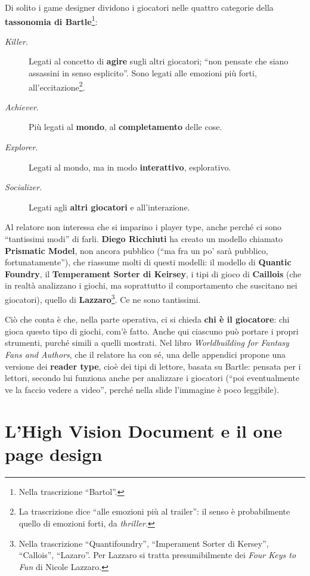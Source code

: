 Di solito i game designer dividono i giocatori nelle quattro categorie della
\textbf{tassonomia di Bartle}\footnote{Nella trascrizione ``Bartol''.}:
\begin{description}
  \item[\emph{Killer}.] Legati al concetto di \textbf{agire} sugli altri
        giocatori; ``non pensate che siano assassini in senso esplicito''. Sono
        legati alle emozioni più forti, all'eccitazione\footnote{La trascrizione
        dice ``alle emozioni più al trailer'': il senso è probabilmente quello di
        emozioni forti, da \emph{thriller}.}.
  \item[\emph{Achiever}.] Più legati al \textbf{mondo}, al \textbf{completamento}
        delle cose.
  \item[\emph{Explorer}.] Legati al mondo, ma in modo \textbf{interattivo},
        esplorativo.
  \item[\emph{Socializer}.] Legati agli \textbf{altri giocatori} e
        all'interazione.
\end{description}
Al relatore non interessa che si imparino i player type, anche perché ci sono
``tantissimi modi'' di farli. \textbf{Diego Ricchiuti} ha creato un modello
chiamato \textbf{Prismatic Model}, non ancora pubblico (``ma fra un po' sarà
pubblico, fortunatamente''), che riassume molti di questi modelli: il modello di
\textbf{Quantic Foundry}, il \textbf{Temperament Sorter di Keirsey}, i tipi di
gioco di \textbf{Caillois} (che in realtà analizzano i giochi, ma soprattutto il
comportamento che suscitano nei giocatori), quello di
\textbf{Lazzaro}\footnote{Nella trascrizione ``Quantifoundry'', ``Imperament
Sorter di Kersey'', ``Callois'', ``Lazaro''. Per Lazzaro si tratta
presumibilmente dei \emph{Four Keys to Fun} di Nicole Lazzaro.}. Ce ne sono
tantissimi.

Ciò che conta è che, nella parte operativa, ci si chieda \textbf{chi è il
giocatore}: chi gioca questo tipo di giochi, com'è fatto. Anche qui ciascuno può
portare i propri strumenti, purché simili a quelli mostrati. Nel libro
\emph{Worldbuilding for Fantasy Fans and Authors}, che il relatore ha con sé, una
delle appendici propone una versione dei \textbf{reader type}, cioè dei tipi di
lettore, basata su Bartle: pensata per i lettori, secondo lui funziona anche per
analizzare i giocatori (``poi eventualmente ve la faccio vedere a video'',
perché nella slide l'immagine è poco leggibile).

\section{L'High Vision Document e il one page design}
\label{sec:z6-vision-document}

